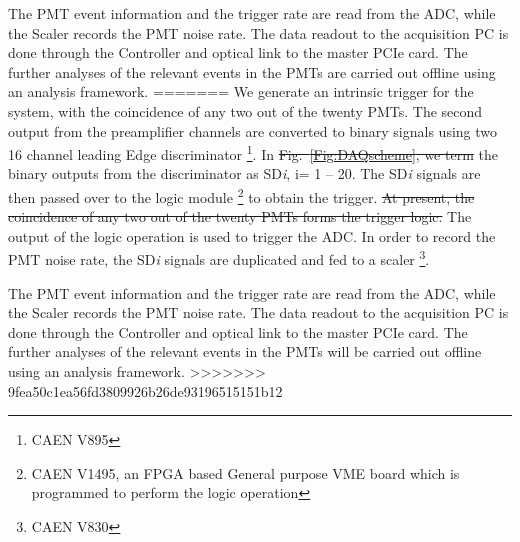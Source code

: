 The PMT event information and the trigger rate are read from the ADC, while the Scaler 
records the PMT noise rate. The data readout to the acquisition PC is done through the 
Controller and optical link to the master PCIe card. The further analyses of the 
relevant events in the PMTs are carried out offline using an analysis 
framework.
=======
 We generate an intrinsic trigger for the system, with the coincidence of any two out of the twenty PMTs. The second output from the preamplifier channels are converted to binary signals using two 16 channel leading Edge discriminator \footnote{CAEN V895}. In \sout{Fig.~\ref{Fig:DAQscheme}, we term} the binary outputs from the discriminator  as SD{\it i}, i= 1 -- 20. The SD{\it i} signals are then passed over to the logic module \footnote{CAEN V1495, an FPGA based General purpose VME board which is programmed to perform the 
logic operation} to obtain the trigger.  \sout{At present, the coincidence of any two out of the twenty PMTs forms the trigger logic.} The output of the logic operation is 
used to trigger the ADC. In order to record the PMT noise rate, the 
SD{\it i} signals are duplicated and fed to a scaler \footnote{CAEN V830}.




The PMT event information and the trigger rate are read from the ADC, while the Scaler records the PMT noise rate. The data readout to the acquisition PC is done through the Controller and optical link to the master PCIe card. The further analyses of the relevant events in the PMTs will be carried out offline using an analysis framework.
>>>>>>> 9fea50c1ea56fd3809926b26de93196515151b12





